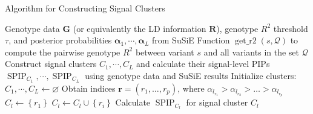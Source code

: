 \documentclass[pdflatex,sn-mathphys-num]{sn-jnl}%
\theoremstyle{thmstyleone}%
\theoremstyle{thmstyletwo}%
\theoremstyle{thmstylethree}%
\begin{document}
\begin{algorithm}
    \caption{Algorithm for Constructing Signal Clusters}\label{signal_clusters}
    \begin{algorithmic}[1]
    \Require Genotype data $\mathbf{G}$ (or equivalently the LD information $\mathbf{R}$), genotype $R^2$ threshold $\tau$, and posterior probabilities $\boldsymbol{\alpha}_1, \cdots, \boldsymbol{\alpha}_L$ from SuSiE
    \Require Function $\operatorname{get\_r2}\left(s,\mathcal{Q}\right)$ to compute the pairwise genotype $R^2$ between variant $s$ and all variants in the set $\mathcal{Q}$
    \Ensure Construct signal clusters $C_1, \cdots, C_L$ and calculate their signal-level PIPs $\operatorname{SPIP}_{C_1}, \cdots, \operatorname{SPIP}_{C_L}$ using genotype data and SuSiE results
    \State Initialize clusters: $C_1, \cdots, C_L \gets \varnothing$
        \State Obtain indices $\boldsymbol{r} = \left(r_1,\ldots,r_p\right)$, where $\alpha_{l_{r_1}} > \alpha_{l_{r_2}} > \ldots > \alpha_{l_{r_p}}$ 
        \State $C_l \gets \left\{r_1\right\}$ 
                \State $C_l \gets C_l \cup \left\{r_i\right\}$ 
            \EndIf
        \EndFor
        \State Calculate $\operatorname{SPIP}_{C_l}$ for signal cluster $C_l$ 
    \EndFor
    \end{algorithmic}
\end{algorithm}
\end{document}
